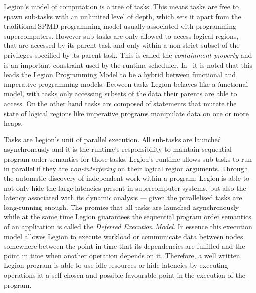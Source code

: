 \documentclass{article}      %
\begin{document}
Legion's model of computation is a tree of tasks. This means tasks are free to spawn sub-tasks with an unlimited level of depth, which sets it apart from the traditional SPMD programming model usually associated with programming supercomputers. However sub-tasks are only allowed to access logical regions, that are accessed by its parent task and only within a non-strict subset of the privileges specified by its parent task. This is called the \emph{containment property} and is an important constraint used by the runtime scheduler. In~\cite{BauerThesis} it is noted that this leads the Legion Programming Model to be a hybrid between functional and imperative programming models: Between tasks Legion behaves like a functional model, with tasks only accessing subsets of the data their parents are able to access. On the other hand tasks are composed of statements that mutate the state of logical regions like imperative programs manipulate data on one or more heaps.

Tasks are Legion's unit of parallel execution. All sub-tasks are launched asynchronously and it is the runtime's responsibility to maintain sequential program order semantics for those tasks. Legion's runtime allows sub-tasks to run in parallel if they are \emph{non-interfering} on their logical region arguments. Through the automatic discovery of independent work within a program, Legion is able to not only hide the large latencies present in supercomputer systems, but also the latency associated with its dynamic analysis --- given the parallelised tasks are long-running enough. The promise that all tasks are launched asynchronously while at the same time Legion guarantees the sequential program order semantics of an application is called the \emph{Deferred Execution Model}. In essence this execution model allowes Legion to execute workload or communicate data between nodes somewhere between the point in time that its dependencies are fulfilled and the point in time when another operation depends on it. Therefore, a well written Legion program is able to use idle resources or hide latencies by executing operations at a self-chosen and possible favourable point in the execution of the program.
\end{document}
